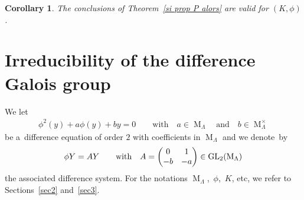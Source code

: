 \documentclass[11pt]{article}
\numberwithin{equation}{section}
\newtheorem{Corollary}[Theorem]{Corollary}
\begin{document}
\begin{Corollary}
\label{coro1}
The conclusions of Theorem~{\rm \ref{si prop P alors}} are valid for $(K,\phi)$.
\end{Corollary}
\setcounter{section}{3}
\setcounter{subsection}{2}
\setcounter{subsubsection}{0}
\setcounter{Theorem}{5}
\setcounter{equation}{3}
\section{Irreducibility of the dif\/ference Galois group}
\label{sec4}
We let
\begin{gather}
\label{equation d ordre 2}
\phi^{2}(y) + a \phi(y)+by=0 \qquad \text{with} \quad a \in \operatorname{M}_{\Lambda} \quad \text{and} \quad b\in
\operatorname{M}_{\Lambda}^{\times}
\end{gather}
be a~dif\/ference equation of order $2$ with coef\/f\/icients in $\operatorname{M}_{\Lambda}$ and we denote~by
\begin{gather*}
\phi Y=AY \qquad \hbox{with} \quad A=
\begin{pmatrix}
0&1
\\
-b&-a
\end{pmatrix}
\in \operatorname{GL}_{2}(\operatorname{M}_{\Lambda})
\end{gather*}
the associated dif\/ference system.
For the notations $\operatorname{M}_{\Lambda}$,~$\phi$,~$K$, etc, we refer to Sections~\ref{sec2} and~\ref{sec3}.
\end{document}
